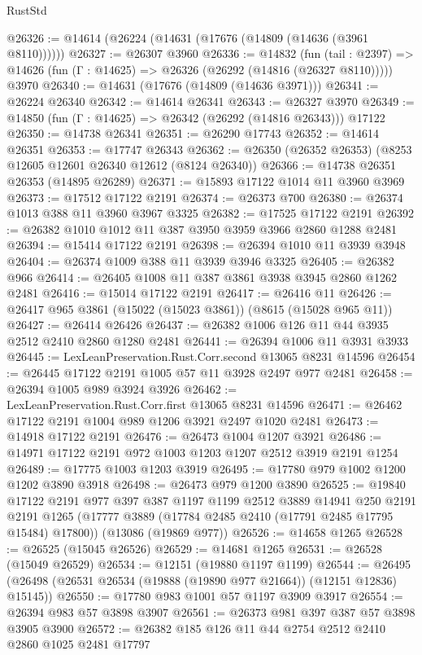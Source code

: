 \begin{lexlean}{RustStd}
\begin{coremodule}
@26326 := @14614 (@26224 (@14631 (@17676 (@14809 (@14636 (@3961 @8110))))))
@26327 := @26307 @3960
@26336 := @14832
    (fun (tail : @2397) => @14626 (fun (Γ : @14625) => @26326 (@26292 (@14816 (@26327 @8110)))))
    @3970
@26340 := @14631 (@17676 (@14809 (@14636 @3971)))
@26341 := @26224 @26340
@26342 := @14614 @26341
@26343 := @26327 @3970
@26349 := @14850 (fun (Γ : @14625) => @26342 (@26292 (@14816 @26343))) @17122
@26350 := @14738 @26341
@26351 := @26290 @17743
@26352 := @14614 @26351
@26353 := @17747 @26343
@26362 := @26350 (@26352 @26353) (@8253 @12605 @12601 @26340 @12612 (@8124 @26340))
@26366 := @14738 @26351 @26353 (@14895 @26289)
@26371 := @15893 @17122 @1014 @11 @3960 @3969
@26373 := @17512 @17122 @2191
@26374 := @26373 @700
@26380 := @26374 @1013 @388 @11 @3960 @3967 @3325
@26382 := @17525 @17122 @2191
@26392 := @26382 @1010 @1012 @11 @387 @3950 @3959 @3966 @2860 @1288 @2481
@26394 := @15414 @17122 @2191
@26398 := @26394 @1010 @11 @3939 @3948
@26404 := @26374 @1009 @388 @11 @3939 @3946 @3325
@26405 := @26382 @966
@26414 := @26405 @1008 @11 @387 @3861 @3938 @3945 @2860 @1262 @2481
@26416 := @15014 @17122 @2191
@26417 := @26416 @11
@26426 := @26417 @965 @3861 (@15022 (@15023 @3861)) (@8615 (@15028 @965 @11))
@26427 := @26414 @26426
@26437 := @26382 @1006 @126 @11 @44 @3935 @2512 @2410 @2860 @1280 @2481
@26441 := @26394 @1006 @11 @3931 @3933
@26445 := LexLeanPreservation.Rust.Corr.second @13065 @8231 @14596
@26454 := @26445 @17122 @2191 @1005 @57 @11 @3928 @2497 @977 @2481
@26458 := @26394 @1005 @989 @3924 @3926
@26462 := LexLeanPreservation.Rust.Corr.first @13065 @8231 @14596
@26471 := @26462 @17122 @2191 @1004 @989 @1206 @3921 @2497 @1020 @2481
@26473 := @14918 @17122 @2191
@26476 := @26473 @1004 @1207 @3921
@26486 := @14971 @17122 @2191 @972 @1003 @1203 @1207 @2512 @3919 @2191 @1254
@26489 := @17775 @1003 @1203 @3919
@26495 := @17780 @979 @1002 @1200 @1202 @3890 @3918
@26498 := @26473 @979 @1200 @3890
@26525 := @19840
    @17122
    @2191
    @977
    @397
    @387
    @1197
    @1199
    @2512
    @3889
    @14941
    @250
    @2191
    @2191
    @1265
    (@17777 @3889 (@17784 @2485 @2410 (@17791 @2485 @17795 @15484) @17800))
    (@13086 (@19869 @977))
@26526 := @14658 @1265
@26528 := @26525 (@15045 @26526)
@26529 := @14681 @1265
@26531 := @26528 (@15049 @26529)
@26534 := @12151 (@19880 @1197 @1199)
@26544 := @26495 (@26498 (@26531 @26534 (@19888 (@19890 @977 @21664)) (@12151 @12836) @15145))
@26550 := @17780 @983 @1001 @57 @1197 @3909 @3917
@26554 := @26394 @983 @57 @3898 @3907
@26561 := @26373 @981 @397 @387 @57 @3898 @3905 @3900
@26572 := @26382 @185 @126 @11 @44 @2754 @2512 @2410 @2860 @1025 @2481 @17797

\end{coremodule}
\end{lexlean}
